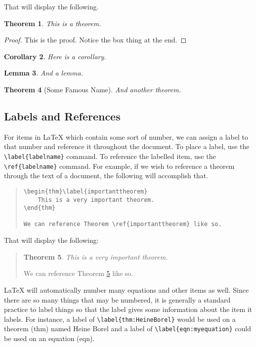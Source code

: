 \documentclass[letterpaper,twoside,10pt]{article}
\newtheorem{thm}{Theorem}[section]
\newtheorem{cor}[thm]{Corollary}
\newtheorem{lem}[thm]{Lemma}
\begin{document}
That will display the following.

\begin{thm}
This is a theorem.
\end{thm}

\begin{proof}
This is the proof. Notice the box thing at the end.
\end{proof}

\begin{cor}
Here is a corollary.
\end{cor}

\begin{lem}
And a lemma.
\end{lem}

\begin{thm}[Some Famous Name]
And another theorem.
\end{thm}

\newpage
\subsection{Labels and References}

For items in {\LaTeX} which contain some sort of number, we can assign a label to that number and
reference it throughout the document. To place a label, use the \verb!\label{labelname}! command. To
reference the labelled item, use the \verb!\ref{labelname}! command. For example, if we wish to
reference a theorem through the text of a document, the following will accomplish that.

\begin{quote}
\begin{verbatim}
\begin{thm}\label{importanttheorem}
    This is a very important theorem.
\end{thm}

We can reference Theorem \ref{importanttheorem} like so.
\end{verbatim}
\end{quote}


That will display the following:

\begin{quote}
\begin{thm}\label{importanttheorem}
 This is a very important theorem.
\end{thm}

We can reference Theorem \ref{importanttheorem} like so.
\end{quote}

{\LaTeX} will automatically number many equations and other items as well. Since there are so many
things that may be numbered, it is generally a standard practice to label things so that the label
gives some information about the item it labels. For instance, a label of
\verb!\label{thm:HeineBorel}! would be used on a theorem (thm) named Heine Borel and a label of
\verb!\label{eqn:myequation}! could be used on an equation (eqn). 
\end{document}
